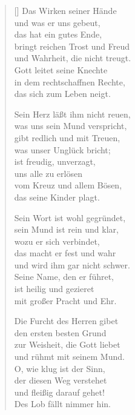 \begin{multicols}{2}
\begin{verse}[\versewidth]
 Das Wirken seiner Hände\\
und was er uns gebeut,\\
das hat ein gutes Ende,\\
bringt reichen Trost und Freud\\
und Wahrheit, die nicht treugt.\\
Gott leitet seine Knechte\\
in dem rechtschaffnen Rechte,\\
das sich zum Leben neigt.

 Sein Herz läßt ihm nicht reuen,\\
was uns sein Mund verspricht,\\
gibt redlich und mit Treuen,\\
was unser Unglück bricht;\\
ist freudig, unverzagt,\\
uns alle zu erlösen\\
vom Kreuz und allem Bösen,\\
das seine Kinder plagt.

 Sein Wort ist wohl gegründet,\\
sein Mund ist rein und klar,\\
wozu er sich verbindet,\\
das macht er fest und wahr\\
und wird ihm gar nicht schwer.\\
Seine Name, den er führet,\\
ist heilig und gezieret\\
mit großer Pracht und Ehr.

 Die Furcht des Herren gibet\\
den ersten besten Grund\\
zur Weisheit, die Gott liebet\\
und rühmt mit seinem Mund.\\
O, wie klug ist der Sinn,\\
der diesen Weg verstehet\\
und fleißig darauf gehet!\\
Des Lob fällt nimmer hin.

\end{verse}
\end{multicols}
